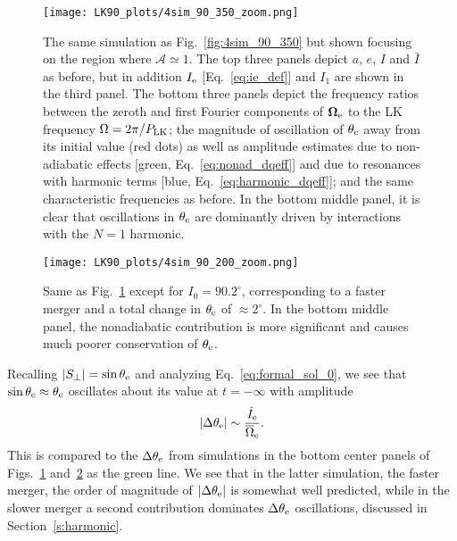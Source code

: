 \documentclass[
        twocolumn,
        twocolappendix
    ]{aastex63}
\newcommand*{\abs}[1]{\left|#1\right|}
\renewcommand*{\bm}[1]{\boldsymbol{\mathbf{#1}}}
\begin{document}
\begin{figure*}
    \centering
    \texttt{[image: LK90\_plots/4sim\_90\_350\_zoom.png]}
    \caption{The same simulation as Fig.~\ref{fig:4sim_90_350} but shown
    focusing on the region where $\mathcal{A} \simeq 1$. The top three
    panels depict $a$, $e$, $I$ and $\bar{I}$ as before, but in addition $I_{\rm
    e}$ [Eq.~\eqref{eq:ie_def}] and $I_1$ are shown in the third panel. The
    bottom three panels depict the frequency ratios between the zeroth and first
    Fourier components of $\bm{\Omega}_{\rm e}$ to the LK frequency $\Omega =
    2\pi / P_{\rm LK}$; the magnitude of oscillation of $\theta_{\rm e}$ away
    from its initial value (red dots) as well as amplitude estimates due to
    non-adiabatic effects [green, Eq.~\eqref{eq:nonad_dqeff}] and due to
    resonances with harmonic terms [blue, Eq.~\eqref{eq:harmonic_dqeff}]; and
    the same characteristic frequencies as before. In the bottom middle panel,
    it is clear that oscillations in $\theta_{\rm e}$ are dominantly driven by
    interactions with the $N = 1$ harmonic.}\label{fig:4sim_90_350_zoom}
\end{figure*}

\begin{figure*}
    \centering
    \texttt{[image: LK90\_plots/4sim\_90\_200\_zoom.png]}
    \caption{Same as Fig.~\ref{fig:4sim_90_350_zoom} except for $I_0 =
    90.2^\circ$, corresponding to a faster merger and a total change in
    $\theta_{\rm e}$ of $\approx 2^\circ$. In the bottom middle panel, the
    nonadiabatic contribution is more significant and causes much poorer
    conservation of $\theta_{\rm e}$.}\label{fig:4sim_90_200_zoom}
\end{figure*}

Recalling $\abs{S_{\perp}} = \sin \theta_{\rm e}$ and analyzing
Eq.~\eqref{eq:formal_sol_0}, we see that $\sin \theta_{\rm e} \approx
\theta_{\rm e}$ oscillates about its value at $t = -\infty$ with amplitude
\begin{equation}
    \abs{\Delta \theta_{\rm e}} \sim
        \frac{\dot{I}_{\rm e}}{\overline{\Omega}_{\rm e}}.\label{eq:nonad_dqeff}
\end{equation}
This is compared to the $\Delta \theta_{\rm e}$ from simulations in the bottom
center panels of Figs.~\ref{fig:4sim_90_350_zoom} and~\ref{fig:4sim_90_200_zoom}
as the green line. We see that in the latter simulation, the faster merger, the
order of magnitude of $\abs{\Delta \theta_{\rm e}}$ is somewhat well predicted,
while in the slower merger a second contribution dominates $\Delta \theta_{\rm
e}$ oscillations, discussed in Section~\ref{s:harmonic}.
\end{document}
